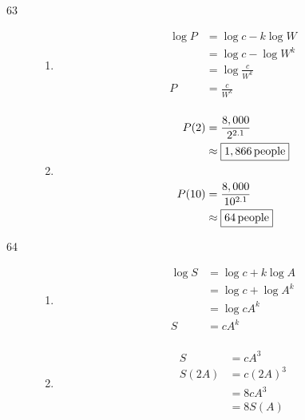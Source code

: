 \documentclass{exam}
\begin{document}
\begin{description}
      \item[63]
        \begin{enumerate}[a]
          \item 
            \begin{align*}
              \log P &= \log c - k \log W \\
                     &= \log c - \log W^k \\
                     &= \log \frac{c}{W^k} \\
                   P &= \boxed{\frac{c}{W^k}} \\
            \end{align*}

          \item
            \begin{align*}
              P(2)  & = \frac{8,000}{2^{2.1}} \\
                    & \approx \boxed{\unit[1,866]{people}} \\
              \\
              P(10) & = \frac{8,000}{10^{2.1}} \\
                    & \approx \boxed{\unit[64]{people}} \\
            \end{align*}

        \end{enumerate}

      \ifprintanswers
        \pagebreak
      \fi

      \item[64]
        \begin{enumerate}[a]
          \item 
            \begin{align*}
              \log S &= \log c + k \log A \\
                     &= \log c + \log A^k \\
                     &= \log cA^k \\
                   S &= \boxed{cA^k} \\
            \end{align*}

          \item
            \begin{align*}
              S     &= cA^3 \\
              S(2A) &= c \left( 2A \right)^3 \\
                    &= 8 cA^3 \\
                    &= \boxed{8 S(A)} \\
            \end{align*}

        \end{enumerate}


    \end{description}
\end{document}

